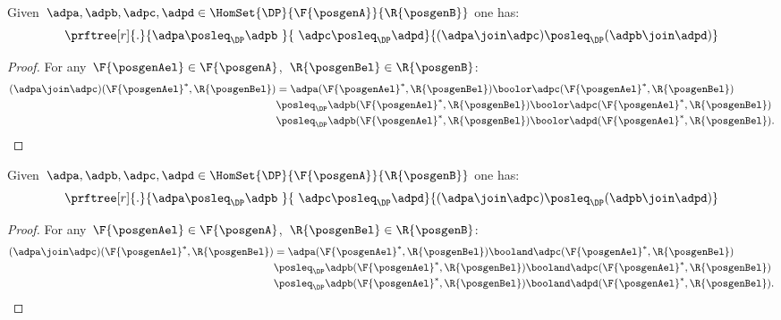 \begin{lemma}
    \label{lem:coprod_mon}
    Given~$\adpa,\adpb,\adpc,\adpd \in \HomSet{\DP}{\F{\posgenA}}{\R{\posgenB}}$ one has:
    \begin{equation*}
        \prftree[r]{.}{\adpa\posleq_\DP \adpb\ }{\ \adpc\posleq_\DP\adpd}{(\adpa\join\adpc)\posleq_\DP (\adpb\join \adpd)}
    \end{equation*}
\end{lemma}
\begin{proof}
    For any~$\F{\posgenAel}\in \F{\posgenA}$,~$\R{\posgenBel}\in \R{\posgenB}$:
    \begin{equation*}
        \begin{aligned}
            (\adpa \join \adpc)(\F{\posgenAel}^*,\R{\posgenBel})
             & =\adpa(\F{\posgenAel}^*,\R{\posgenBel})\boolor \adpc(\F{\posgenAel}^*,\R{\posgenBel})             \\
             & \posleq_\DP \adpb(\F{\posgenAel}^*,\R{\posgenBel})\boolor \adpc(\F{\posgenAel}^*,\R{\posgenBel})  \\
             & \posleq_\DP \adpb(\F{\posgenAel}^*,\R{\posgenBel})\boolor \adpd(\F{\posgenAel}^*,\R{\posgenBel}).
        \end{aligned}
    \end{equation*}
\end{proof}

\begin{lemma}
    \label{lem:intersection_mon}
    Given~$\adpa,\adpb,\adpc,\adpd \in \HomSet{\DP}{\F{\posgenA}}{\R{\posgenB}}$ one has:
    \begin{equation*}
        \prftree[r]{.}{\adpa\posleq_\DP \adpb\ }{\ \adpc\posleq_\DP \adpd}{(\adpa\join \adpc)\posleq_\DP (\adpb\join \adpd)}
    \end{equation*}
\end{lemma}
\begin{proof}
    For any~$\F{\posgenAel}\in \F{\posgenA}$,~$\R{\posgenBel}\in \R{\posgenB}$:
    \begin{equation*}
        \begin{aligned}
            (\adpa \join \adpc)(\F{\posgenAel}^*,\R{\posgenBel})
             & =\adpa(\F{\posgenAel}^*,\R{\posgenBel})\booland \adpc(\F{\posgenAel}^*,\R{\posgenBel})             \\
             & \posleq_\DP \adpb(\F{\posgenAel}^*,\R{\posgenBel})\booland \adpc(\F{\posgenAel}^*,\R{\posgenBel})  \\
             & \posleq_\DP \adpb(\F{\posgenAel}^*,\R{\posgenBel})\booland \adpd(\F{\posgenAel}^*,\R{\posgenBel}).
        \end{aligned}
    \end{equation*}
\end{proof}